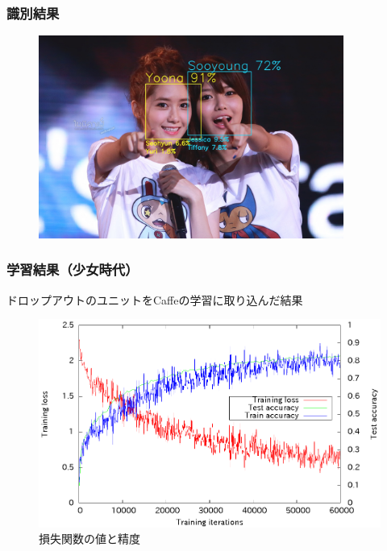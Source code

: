 \documentclass[dvipdfmx,11pt,notheorems]{beamer}
\theoremstyle{definition}
\begin{document}
\begin{frame}\frametitle{識別結果}
\begin{figure}[t]
  \begin{center}
    \includegraphics[clip,width=10cm, bb = 0 0 1500 1000]{./fig/jpg/yoona_sooyoung.jpg}\\
  \end{center}
\end{figure}
\end{frame}

\begin{frame}\frametitle{学習結果（少女時代）}
ドロップアウトのユニットをCaffeの学習に取り込んだ結果
 \begin{figure}[ht]
 \centering
 \includegraphics[scale=0.85]{fig/eps/result_dropout_test_graph_snsd.eps}
 \caption{損失関数の値と精度}
\end{figure}
\end{frame}
\end{document}
